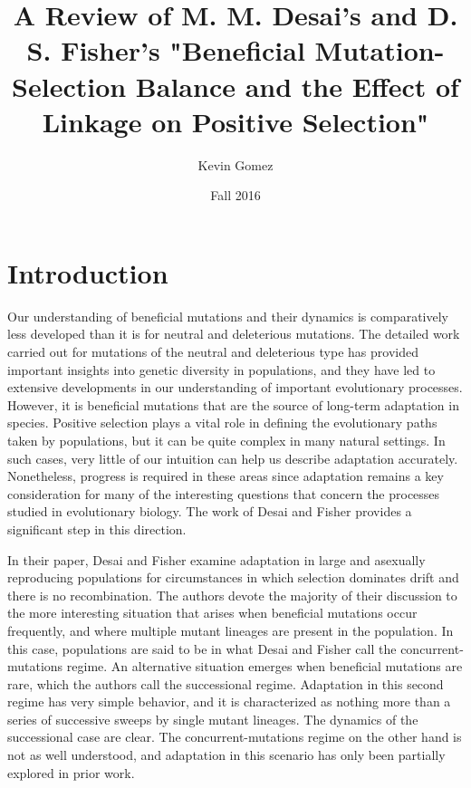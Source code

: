 \documentclass[12pt, one column]{article}
\title{A Review of M. M. Desai's and D. S. Fisher's "Beneficial Mutation-Selection Balance and the Effect of Linkage on Positive Selection"}
\date{Fall 2016}
\author{Kevin Gomez}
\begin{document}
\maketitle
\newpage


\newpage
\section*{Introduction}
Our understanding of beneficial mutations and their dynamics is comparatively less developed than it is for neutral and deleterious mutations.  The detailed work carried out for mutations of the neutral and deleterious type has provided important insights into genetic diversity in populations, and they have led to extensive developments in our understanding of important evolutionary processes.  However, it is beneficial mutations that are the source of long-term adaptation in species.  Positive selection plays a vital role in defining the evolutionary paths taken by populations, but it can be quite complex in many natural settings.  In such cases, very little of our intuition can help us describe adaptation accurately.  Nonetheless, progress is required in these areas since adaptation remains a key consideration for many of the interesting questions that concern the processes studied in evolutionary biology.  The work of Desai and Fisher provides a significant step in this direction.

In their paper, Desai and Fisher examine adaptation in large and asexually reproducing populations for circumstances in which selection dominates drift and there is no recombination.  The authors devote the majority of their discussion to the more interesting situation that arises when beneficial mutations occur frequently, and where multiple mutant lineages are present in the population.  In this case, populations are said to be in what Desai and Fisher call the concurrent-mutations regime.  An alternative situation emerges when beneficial mutations are rare, which the authors call the successional regime.  Adaptation in this second regime has very simple behavior, and it is characterized as nothing more than a series of successive sweeps by single mutant lineages.  The dynamics of the successional case are clear.  The concurrent-mutations regime on the other hand is not as well understood, and adaptation in this scenario has only been partially explored in prior work.
\end{document}
